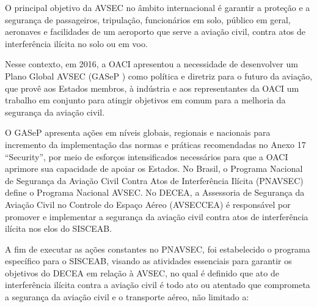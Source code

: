 \documentclass[
]{book}
\begin{document}
O principal objetivo da AVSEC no âmbito internacional é garantir a proteção e a segurança de passageiros, tripulação, funcionários em solo, público em geral, aeronaves e facilidades de um aeroporto que serve a aviação civil, contra atos de interferência ilícita no solo ou em voo.

Nesse contexto, em 2016, a OACI apresentou a necessidade de desenvolver um Plano Global AVSEC (GASeP ) como política e diretriz para o futuro da aviação, que provê aos Estados membros, à indústria e aos representantes da OACI um trabalho em conjunto para atingir objetivos em comum para a melhoria da segurança da aviação civil.

O GASeP apresenta ações em níveis globais, regionais e nacionais para incremento da implementação das normas e práticas recomendadas no Anexo 17 ``Security'', por meio de esforços intensificados necessários para que a OACI aprimore sua capacidade de apoiar os Estados.
No Brasil, o Programa Nacional de Segurança da Aviação Civil Contra Atos de Interferência Ilícita (PNAVSEC) define o Programa Nacional AVSEC. No DECEA, a Assessoria de Segurança da Aviação Civil no Controle do Espaço Aéreo (AVSECCEA) é responsável por promover e implementar a segurança da aviação civil contra atos de interferência ilícita nos elos do SISCEAB.

A fim de executar as ações constantes no PNAVSEC, foi estabelecido o programa específico para o SISCEAB, visando as atividades essenciais para garantir os objetivos do DECEA em relação à AVSEC, no qual é definido que ato de interferência ilícita contra a aviação civil é todo ato ou atentado que comprometa a segurança da aviação civil e o transporte aéreo, não limitado a:
\end{document}
